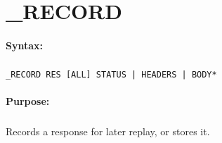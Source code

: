 
\newpage
\section{\_RECORD}
\label{cmd:_RECORD}

\paragraph{Syntax:}
\subparagraph{}
\texttt{\_RECORD RES [ALL] {STATUS | HEADERS | BODY}*}

\paragraph{Purpose:}
\subparagraph{}
Records a response for later replay, or stores it.

